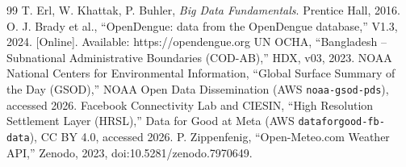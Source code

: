 \documentclass[conference]{IEEEtran}
\begin{document}
\begin{thebibliography}{99}
 T. Erl, W. Khattak, P. Buhler, \emph{Big Data Fundamentals}. Prentice Hall, 2016.
 O. J. Brady et al., ``OpenDengue: data from the OpenDengue database,'' V1.3, 2024. [Online]. Available: https://opendengue.org
 UN OCHA, ``Bangladesh -- Subnational Administrative Boundaries (COD-AB),'' HDX, v03, 2023.
 NOAA National Centers for Environmental Information, ``Global Surface Summary of the Day (GSOD),'' NOAA Open Data Dissemination (AWS \texttt{noaa-gsod-pds}), accessed 2026.
 Facebook Connectivity Lab and CIESIN, ``High Resolution Settlement Layer (HRSL),'' Data for Good at Meta (AWS \texttt{dataforgood-fb-data}), CC BY 4.0, accessed 2026.
 P. Zippenfenig, ``Open-Meteo.com Weather API,'' Zenodo, 2023, doi:10.5281/zenodo.7970649.
\end{thebibliography}

\clearpage
\onecolumn
\appendices

\clearpage

\clearpage

\end{document}
